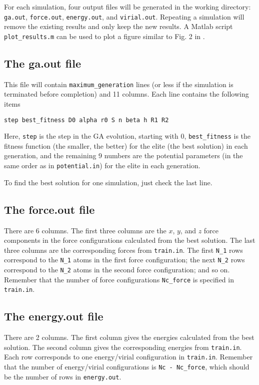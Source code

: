 \documentclass[12pt,a4paper]{report}
\begin{document}
For each simulation, four output files will be generated in the working directory: \verb"ga.out", \verb"force.out", \verb"energy.out", and \verb"virial.out". Repeating a simulation will remove the existing results and only keep the new results. A Matlab script \verb"plot_results.m" can be used to plot a figure similar to Fig. 2 in \cite{fan2019arxiv}.

\subsection{The ga.out file}

This file will contain \verb"maximum_generation" lines (or less if the simulation is terminated before completion) and 11 columns. Each line contains the following items
\begin{verbatim}
step best_fitness D0 alpha r0 S n beta h R1 R2
\end{verbatim}
Here, \verb"step" is the step in the GA evolution, starting with 0, \verb"best_fitness" is the fitness function (the smaller, the better) for the elite (the best solution) in each generation, and the remaining 9 numbers are the potential parameters (in the same order as in \verb"potential.in") for the elite in each generation.

To find the best solution for one simulation, just check the last line.

\subsection{The force.out file}

There are 6 columns. The first three columns are the $x$, $y$, and $z$ force components in the force configurations calculated from the best solution. The last three columns are the corresponding forces from \verb"train.in". The first \verb"N_1" rows correspond to the \verb"N_1" atoms in the first force configuration; the next \verb"N_2" rows correspond to the \verb"N_2" atoms in the second force configuration; and so on. Remember that the number of force configurations \verb"Nc_force" is specified in \verb"train.in".

\subsection{The energy.out file}

There are 2 columns. The first column gives the energies calculated from the best solution. The second column gives the corresponding energies from \verb"train.in". Each row corresponds to one energy/virial configuration in \verb"train.in". Remember that the number of energy/virial configurations is \verb"Nc - Nc_force", which should be the number of rows in \verb"energy.out".
\end{document}
